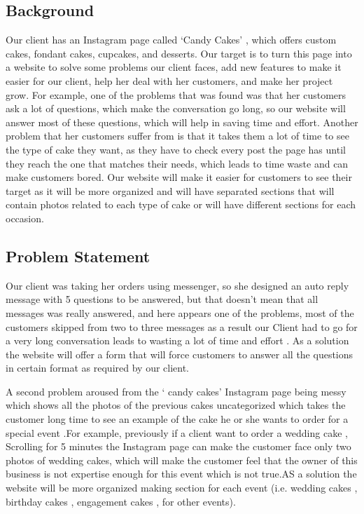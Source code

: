 \documentclass[hidelinks,a4paper,12pt]{article}
\begin{document}
\subsection{Background}
Our client has an Instagram page called ‘Candy Cakes' , which offers custom cakes, fondant cakes, cupcakes, and desserts. Our target is to turn this page into a website to solve some problems our client faces, add new features to make it easier for our client, help her deal with her customers, and make her project grow. For example, one of the problems that was found was that her customers ask a lot of questions, which make the conversation go long, so our website will answer most of these questions, which will help in saving time and effort. Another problem that her customers suffer from is that it takes them a lot of time to see the type of cake they want, as they have to check every post the page has until they reach the one that matches their needs, which leads to time waste and can make customers bored. Our website will make it easier for customers to see their target as it will be more organized and will have separated sections that will contain photos related to each type of cake or will have different sections for each occasion.

\subsection{Problem Statement}
Our client was taking her orders using messenger, so she designed an auto reply message with 5 questions to be answered, but that doesn’t mean that all messages was really answered, and here appears one of the problems, most of the customers skipped from two to three messages as a result our Client had to go for a very long conversation leads to wasting a lot of time and effort . As a solution the website will offer a form that will force customers to answer all the questions in certain format as required by our client.

A second problem aroused from the ‘ candy cakes’ Instagram page being messy which shows all the photos of the previous cakes uncategorized  which takes the customer long time to see an example of the cake  he or she wants to order for a special event .For example, previously if a client want to order a wedding cake , Scrolling for 5 minutes the Instagram page can make the customer face only two photos of wedding cakes, which will make the customer feel that the owner of this business is not expertise enough for this event which is not true.AS a solution the website will be more organized making section for each event (i.e. wedding cakes , birthday cakes , engagement cakes , for other events).  
   
\end{document}
